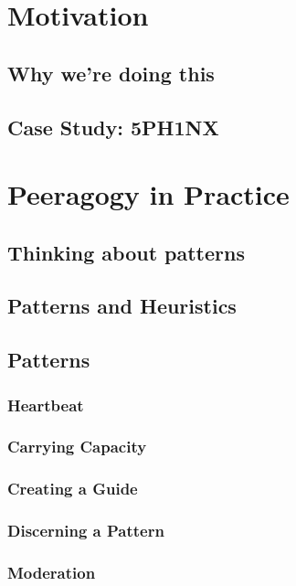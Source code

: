 \documentclass[ebook, 12pt, twoside]{memoir}
\begin{document}
\part{Motivation} %
%
\chapter[\textbf{Why we're doing this}]{Why we're doing this}

%
\chapter[\textbf{Case Study: 5PH1NX}]{Case Study: 5PH1NX}
%



\part{Peeragogy in Practice}  %
%
\chapter[\textbf{Thinking about patterns}]{Thinking about patterns}

%
\chapter[\textbf{Patterns and Heuristics}]{Patterns and Heuristics}
%

%
\chapter[\textbf{Patterns}]{ Patterns }

\section*{Heartbeat}

\section*{Carrying Capacity}

\section*{Creating a Guide}

\section*{Discerning a Pattern}

\section*{Moderation}

\end{document}
